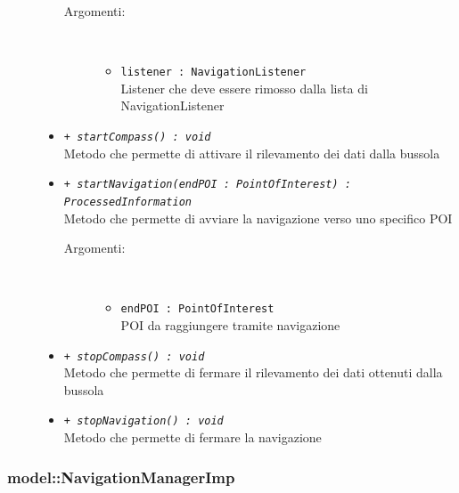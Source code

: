 \documentclass[../DefinizioneDiProdotto.tex]{subfiles}
\begin{document}
\begin{description}
\begin{itemize}
\begin{description}
\item[Argomenti:] \
\begin{itemize}
\item \texttt{listener : NavigationListener}\\
Listener che deve essere rimosso dalla lista di NavigationListener\end{itemize}
\end{description}
\item \texttt{+ \textit{startCompass() : void}}\\
Metodo che permette di attivare il rilevamento dei dati dalla bussola
 \item \texttt{+ \textit{startNavigation(endPOI : PointOfInterest) : ProcessedInformation}}\\
Metodo che permette di avviare la navigazione verso uno specifico POI
 \begin{description}
\item[Argomenti:] \
\begin{itemize}
\item \texttt{endPOI : PointOfInterest}\\
POI da raggiungere tramite navigazione\end{itemize}
\end{description}
\item \texttt{+ \textit{stopCompass() : void}}\\
Metodo che permette di fermare il rilevamento dei dati ottenuti dalla bussola
 \item \texttt{+ \textit{stopNavigation() : void}}\\
Metodo che permette di fermare la navigazione
 \end{itemize}
\end{description}

\subsubsection{model::NavigationManagerImp}
\end{document}
